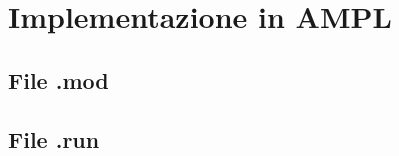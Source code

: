 


\section{Implementazione in AMPL}
	\subsection{File .mod}
		
		\newpage

	\subsection{File .run}
		
		\newpage